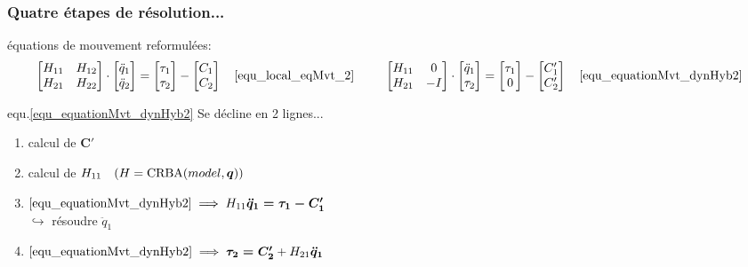 \documentclass[10pt]{beamer}
\begin{document}
\begin{frame}\small

  \frametitle{Quatre étapes de résolution...}
  
  	\begin{block}{\footnotesize{équations de mouvement reformulées:}}\footnotesize
  	\setlength\abovedisplayskip{0pt}
  	\setlength\belowdisplayskip{0pt}
  \begin{align*}
  	\begin{bmatrix}
	  H_{11} & H_{12} \\
	  H_{21} & H_{22}
	\end{bmatrix} 
	\cdot
	\begin{bmatrix}
	  \ddot{q}_{1} \\
	  \ddot{q}_{2}
	\end{bmatrix} 
	= 
	\begin{bmatrix}
	  \tau_{1} \\
	  \tau_{2}
	\end{bmatrix} 
	-
	\begin{bmatrix}
	  C_{1} \\
	  C_{2}
	\end{bmatrix} \quad \eqref{equ_local_eqMvt_2} \hspace{.85cm}
	\begin{bmatrix}
	  H_{11} & 0 \\
	  H_{21} &  -I
	\end{bmatrix} 
	\cdot
	\begin{bmatrix}
	  \ddot{q}_1 \\
	  \tau_2
	\end{bmatrix} 
	=
	\begin{bmatrix}
	  \tau_1 \\
	  0
	\end{bmatrix} 
	-
	\begin{bmatrix}
	  C'_{1} \\
	  C'_{2}
	\end{bmatrix} \quad \eqref{equ_equationMvt_dynHyb2} \\
	\end{align*}
  \end{block}
  
  \bigskip
  equ.\eqref{equ_equationMvt_dynHyb2} Se décline en 2 lignes... \bigskip \\
  \begin{enumerate}
  \item <3-> calcul de $\boldsymbol{C'}$
  \item <3-> calcul de $H_{11} \quad ( H = \mathrm{CRBA}(model,\boldsymbol{q}) )$
  \item <1-> ${\eqref{equ_equationMvt_dynHyb2} \implies H_{11} \boldsymbol{\ddot{q}_1 = \tau_1 - C'_1}}$ \\
  $\hookrightarrow$ résoudre $\ddot{q}_1$
  \item <2-> $\eqref{equ_equationMvt_dynHyb2} \implies \boldsymbol{\tau_2 = C'_2} + H_{21} \boldsymbol{\ddot{q}_1}$
  \end{enumerate}
  \vfill

\end{frame}
\end{document}
